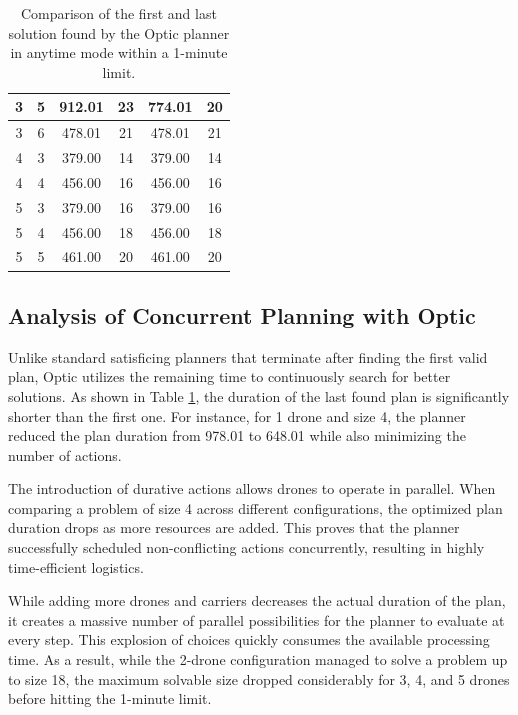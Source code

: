\documentclass{article}
\begin{document}
\begin{table}[H]
{\begin{tabular}{|c|c|c|c|c|c|}
3 & 5 & 912.01 & 23 & 774.01 & 20 \\ \hline
3 & 6 & 478.01 & 21 & 478.01 & 21 \\ \hline
4 & 3 & 379.00 & 14 & 379.00 & 14 \\ \hline
4 & 4 & 456.00 & 16 & 456.00 & 16 \\ \hline
5 & 3 & 379.00 & 16 & 379.00 & 16 \\ \hline
5 & 4 & 456.00 & 18 & 456.00 & 18 \\ \hline
5 & 5 & 461.00 & 20 & 461.00 & 20 \\ \hline
\end{tabular}%
}
\caption{Comparison of the first and last solution found by the Optic planner in anytime mode within a 1-minute limit.}
\label{tab:optic_comparison}
\end{table}

\subsection{Analysis of Concurrent Planning with Optic}

Unlike standard satisficing planners that terminate after finding the first valid plan, Optic utilizes the remaining time to continuously search for better solutions. As shown in Table \ref{tab:optic_comparison}, the duration of the last found plan is significantly shorter than the first one. For instance, for 1 drone and size 4, the planner reduced the plan duration from 978.01 to 648.01 while also minimizing the number of actions. 
    
The introduction of durative actions allows drones to operate in parallel. When comparing a problem of size 4 across different configurations, the optimized plan duration drops as more resources are added. This proves that the planner successfully scheduled non-conflicting actions concurrently, resulting in highly time-efficient logistics.
    
While adding more drones and carriers decreases the actual duration of the plan, it creates a massive number of parallel possibilities for the planner to evaluate at every step. This explosion of choices quickly consumes the available processing time. As a result, while the 2-drone configuration managed to solve a problem up to size 18, the maximum solvable size dropped considerably for 3, 4, and 5 drones before hitting the 1-minute limit.
\end{document}
